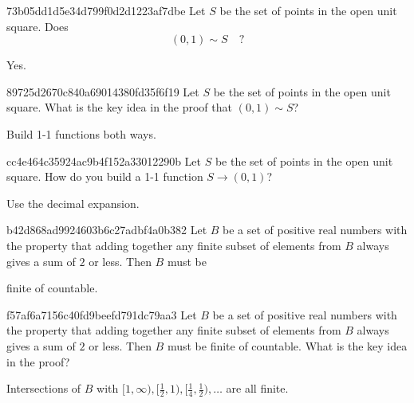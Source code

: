 \begin{note}{73b05dd1d5e34d799f0d2d1223af7dbe}
    Let \({ S }\) be the set of points in the open unit square. Does
    \[
        (0, 1) \sim S \quad ?
    \]

    \begin{cloze}{1}
        Yes.
    \end{cloze}
\end{note}

\begin{note}{89725d2670c840a69014380fd35f6f19}
    Let \({ S }\) be the set of points in the open unit square.
    What is the key idea in the proof that \({ (0, 1) \sim S }\)?

    \begin{cloze}{1}
        Build 1-1 functions both ways.
    \end{cloze}
\end{note}

\begin{note}{cc4e464c35924ac9b4f152a33012290b}
    Let \({ S }\) be the set of points in the open unit square.
    How do you build a 1-1 function \({ S \to (0, 1) }\)?

    \begin{cloze}{1}
        Use the decimal expansion.
    \end{cloze}
\end{note}

\begin{note}{b42d868ad9924603b6c27adbf4a0b382}
    Let \({ B }\) be a set of positive real numbers with the property that adding together any finite subset of elements from \({ B }\) always gives a sum of \({ 2 }\) or less. Then \({ B }\) must be \begin{icloze}{1}finite of countable.\end{icloze}
\end{note}

\begin{note}{f57af6a7156c40fd9beefd791dc79aa3}
    Let \({ B }\) be a set of positive real numbers with the property that adding together any finite subset of elements from \({ B }\) always gives a sum of \({ 2 }\) or less. Then \({ B }\) must be finite of countable.
    What is the key idea in the proof?

    \begin{cloze}{1}
        Intersections of \({ B }\) with \({ [1, \infty), [\frac{1}{2}, 1), [\frac{1}{4}, \frac{1}{2}), \ldots }\) are all finite.
    \end{cloze}
\end{note}

